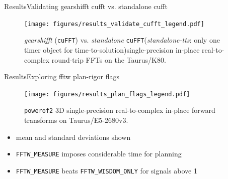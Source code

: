 \documentclass[t,11pt,hyperref={
  pdftitle = {gearshifft},
  pdfsubject = {gearshifft},
  pdfborder={0 0 0},
  colorlinks=true,
  urlcolor=red,
  citecolor=red,
  linkcolor=red,
  pdfauthor={Peter Steinbach, Matthias Werner}
  }
]{beamer}
\newcommand{\cufft}{\texttt{cuFFT}}
\newcommand{\mc}[1]{\texttt{\lstinline!#1!}}
\begin{document}
\begin{frame}{Results}{Validating gearshifft cufft vs. standalone cufft}
\begin{figure}[!htb]
  \centering
  \texttt{[image: figures/results\_validate\_cufft\_legend.pdf]}\\[-.5em]
  \hfill
  \caption{\textit{gearshifft} (\cufft{}) vs. \textit{standalone} \cufft{}\newline(\textit{standalone-tts}: only one timer object for time-to-solution)\newline single-precision in-place real-to-complex round-trip FFTs on the Taurus/K80.}
  \label{fig:verify_cufft}
\end{figure}
\end{frame}


\begin{frame}{Results}{Exploring fftw plan-rigor flags}
\begin{figure}[!htbp]\vspace{-1em}
  \centering
  \texttt{[image: figures/results\_plan\_flags\_legend.pdf]}\\[-.5em]
  \hfill
  \caption{\texttt{powerof2} 3D single-precision real-to-complex in-place forward transforms on Taurus/E5-2680v3.}
  \label{fig:fftw_plan_flags}
\end{figure}
\pause
\vspace{-1em}
\begin{itemize}
\item mean and standard deviations shown
\item \mc{FFTW_MEASURE} imposes considerable time for planning
\item \mc{FFTW_MEASURE} beats \mc{FFTW_WISDOM_ONLY} for signals above \SI{1}{\kibi\byte}
\end{itemize}
\end{frame}
\end{document}
